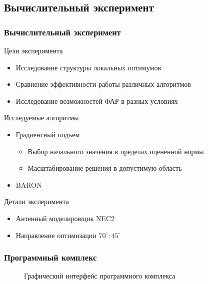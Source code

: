 \subsection{Вычислительный эксперимент}
\begin{frame}
    \frametitle{ Вычислительный эксперимент }
    Цели эксперимента
    \begin{itemize}
      \item Исследование структуры локальных оптимумов
      \item Сравнение эффективности работы различных алгоритмов
      \item Исследование возможностей ФАР в разных условиях
    \end{itemize}
    Исследуемые алгоритмы
    \begin{itemize}
      \item Градиентный подъем 
      \begin{itemize}
        \item Выбор начального значения в пределах оцененной нормы
        \item Масштабирование решения в допустимую область
      \end{itemize}
      \item BARON
    \end{itemize}
    Детали эксперимента
    \begin{itemize}
      \item Антенный моделировщик NEC2
      \item Направление оптимизации $70^{\circ}:45^{\circ}$
    \end{itemize}
\end{frame}

\begin{frame}
    \frametitle{ Программный комплекс}

    \begin{figure}
    \centering
        \begin{minipage}[h]{1\linewidth}
        \end{minipage}
        \vspace{0.7em}
        \caption{Графический интерфейс программного комплекса}
        \label{ris:expi}
    \end{figure}

\end{frame}

